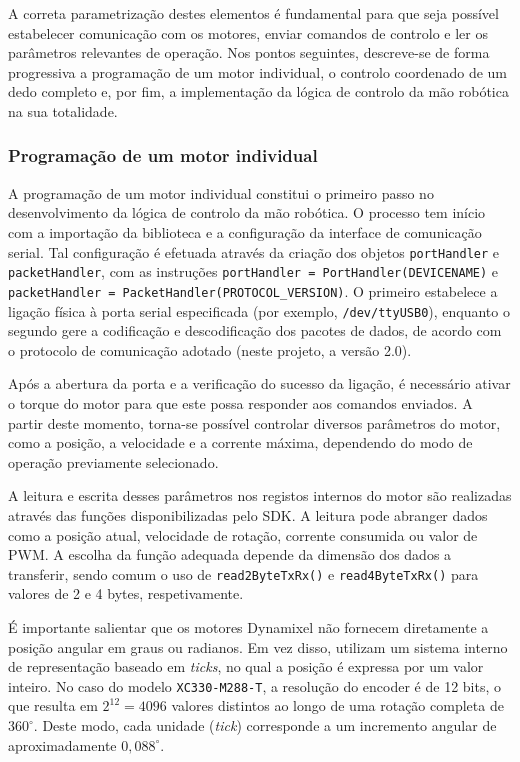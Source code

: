 A correta parametrização destes elementos é fundamental para que seja possível estabelecer comunicação com os motores, enviar comandos de controlo e ler os parâmetros relevantes de operação. Nos pontos seguintes, descreve-se de forma progressiva a programação de um motor individual, o controlo coordenado de um dedo completo e, por fim, a implementação da lógica de controlo da mão robótica na sua totalidade.



\subsubsection{Programação de um motor individual}


A programação de um motor individual constitui o primeiro passo no desenvolvimento da lógica de controlo da mão robótica.
O processo tem início com a importação da biblioteca e a configuração da interface de comunicação serial. Tal configuração é efetuada através da criação dos objetos \texttt{portHandler} e \texttt{packetHandler}, com as instruções \texttt{portHandler = PortHandler(DEVICENAME)} e \texttt{packetHandler = PacketHandler(PROTOCOL\_VERSION)}. O primeiro estabelece a ligação física à porta serial especificada (por exemplo, \texttt{/dev/ttyUSB0}), enquanto o segundo gere a codificação e descodificação dos pacotes de dados, de acordo com o protocolo de comunicação adotado (neste projeto, a versão 2.0).


Após a abertura da porta e a verificação do sucesso da ligação, é necessário ativar o torque do motor para que este possa responder aos comandos enviados. A partir deste momento, torna-se possível controlar diversos parâmetros do motor, como a posição, a velocidade e a corrente máxima, dependendo do modo de operação previamente selecionado.

A leitura e escrita desses parâmetros nos registos internos do motor são realizadas através das funções disponibilizadas pelo SDK. A leitura pode abranger dados como a posição atual, velocidade de rotação, corrente consumida ou valor de PWM. A escolha da função adequada depende da dimensão dos dados a transferir, sendo comum o uso de \texttt{read2ByteTxRx()} e \texttt{read4ByteTxRx()} para valores de 2 e 4 bytes, respetivamente.

É importante salientar que os motores Dynamixel não fornecem diretamente a posição angular em graus ou radianos. Em vez disso, utilizam um sistema interno de representação baseado em \textit{ticks}, no qual a posição é expressa por um valor inteiro. No caso do modelo \texttt{XC330-M288-T}, a resolução do encoder é de 12 bits, o que resulta em $2^{12} = 4096$ valores distintos ao longo de uma rotação completa de $360^\circ$. Deste modo, cada unidade (\textit{tick}) corresponde a um incremento angular de aproximadamente $0{,}088^\circ$.

